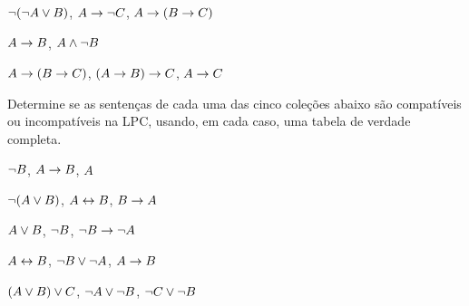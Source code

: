 \begin{earg}
\item $\neg(\neg A \vee B) $, $A \rightarrow \neg C$, $A \rightarrow (B \rightarrow C)$\vspace{.5ex} %

% 
%


\item $A \rightarrow B$, $A \wedge \neg B$\vspace{.5ex} %

\item $A \rightarrow (B \rightarrow C)$, $(A \rightarrow B) \rightarrow C$, $A \rightarrow C$\vspace{.5ex} %

\end{earg}

\noindent\problempart
\label{pr.TT.satisfiable3}
Determine se as sentenças de cada uma das cinco coleções abaixo são  compatíveis ou incompatíveis na LPC, usando, em cada caso, uma tabela de verdade completa.
\begin{earg}
\item $\neg B$, $A \rightarrow B$, $A$ \vspace{.5ex}%
\item $\neg(A \vee B)$, $A \leftrightarrow B$, $B \rightarrow A$\vspace{.5ex} %
\item $A \vee B$, $\neg B$, $\neg B \rightarrow \neg A$\vspace{.5ex} %
\item $A \leftrightarrow B$, $\neg B \vee \neg A$, $A \rightarrow B$\vspace{.5ex} %
\item $(A \vee B) \vee C$, $\neg A \vee \neg B$, $\neg C \vee \neg B$\vspace{.5ex} %
\end{earg}




